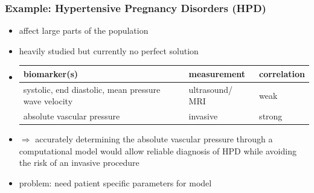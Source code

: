 \documentclass{beamer}
\begin{document}
\begin{frame}
	\frametitle{Example: Hypertensive Pregnancy Disorders (HPD)}
	\begin{itemize}
		\item affect large parts of the population
		\item heavily studied but currently no perfect solution 
		\item \begin{tabular}{| p{4.4cm} | p{2.3cm}| p{2cm} |  } 
				\hline
				biomarker(s) & measurement & correlation \\ 
				\hline
				\hline
				systolic, end diastolic, mean pressure wave velocity & ultrasound/ MRI & weak \\ 
				\hline
				absolute vascular pressure & invasive & strong \\ 
				\hline
			\end{tabular}
		\item
			$\Rightarrow$ accurately determining the absolute vascular pressure through a computational model would allow reliable diagnosis of HPD while avoiding the risk of an invasive procedure
		\item problem: need patient specific parameters for model
	\end{itemize}

\end{frame}
\end{document}
